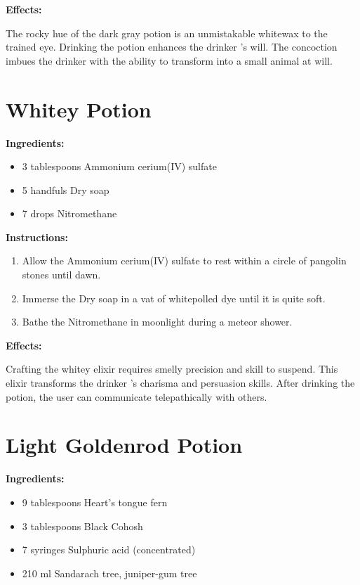 \documentclass{article}
\begin{document}
\textbf{Effects:}

The rocky hue of the dark gray potion is an unmistakable whitewax to the trained eye. Drinking the potion enhances the drinker 's will. The concoction imbues the drinker with the ability to transform into a small animal at will.

\newpage
\section*{Whitey Potion}

\textbf{Ingredients:}

\begin{itemize}
  \item 3 tablespoons Ammonium cerium(IV) sulfate
  \item 5 handfuls Dry  soap
  \item 7 drops Nitromethane
\end{itemize}

\textbf{Instructions:}

\begin{enumerate}
  \item Allow the Ammonium cerium(IV) sulfate to rest within a circle of pangolin stones until dawn.
  \item Immerse the Dry  soap in a vat of whitepolled dye until it is quite soft.
  \item Bathe the Nitromethane in moonlight during a meteor shower.
\end{enumerate}

\textbf{Effects:}

Crafting the whitey elixir requires smelly precision and skill to suspend. This elixir transforms the drinker 's charisma and persuasion skills. After drinking the potion, the user can communicate telepathically with others.

\newpage
\section*{Light Goldenrod Potion}

\textbf{Ingredients:}

\begin{itemize}
  \item 9 tablespoons Heart's tongue fern
  \item 3 tablespoons Black Cohosh
  \item 7 syringes Sulphuric acid (concentrated)
  \item 210 ml Sandarach tree, juniper-gum tree
\end{itemize}
\end{document}

